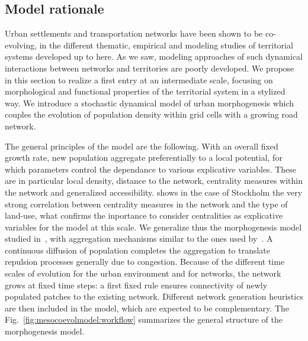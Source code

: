 \documentclass[11pt]{article}
\begin{document}
\subsection{Model rationale}



Urban settlements and transportation networks have been shown to be co-evolving, in the different thematic, empirical  and modeling studies of territorial systems developed up to here. As we saw, modeling approaches of such dynamical interactions between networks and territories are poorly developed. We propose in this section to realize a first entry at an intermediate scale, focusing on morphological and functional properties of the territorial system in a stylized way. We introduce a stochastic dynamical model of urban morphogenesis which couples the evolution of population density within grid cells with a growing road network.


The general principles of the model are the following. With an overall fixed growth rate, new population aggregate preferentially to a local potential, for which parameters control the dependance to various explicative variables. These are in particular local density, distance to the network, centrality measures within the network and generalized accessibility. \cite{doi:10.1080/13658816.2014.893347} shows in the case of Stockholm the very strong correlation between centrality measures in the network and the type of land-use, what confirms the inportance to consider centralities as explicative variables for the model at this scale. We generalize thus the morphogenesis model studied in~\cite{2017arXiv170806743R}, with aggregation mechanisms similar to the ones used by~\cite{raimbault2014hybrid}. A continuous diffusion of population completes the aggregation to translate repulsion processes generally due to congestion. Because of the different time scales of evolution for the urban environment and for networks, the network grows at fixed time steps: a first fixed rule ensures connectivity of newly populated patches to the existing network. Different network generation heuristics are then included in the model, which are expected to be complementary. The Fig.~\ref{fig:mesocoevolmodel:workflow} summarizes the general structure of the morphogenesis model.
\end{document}
